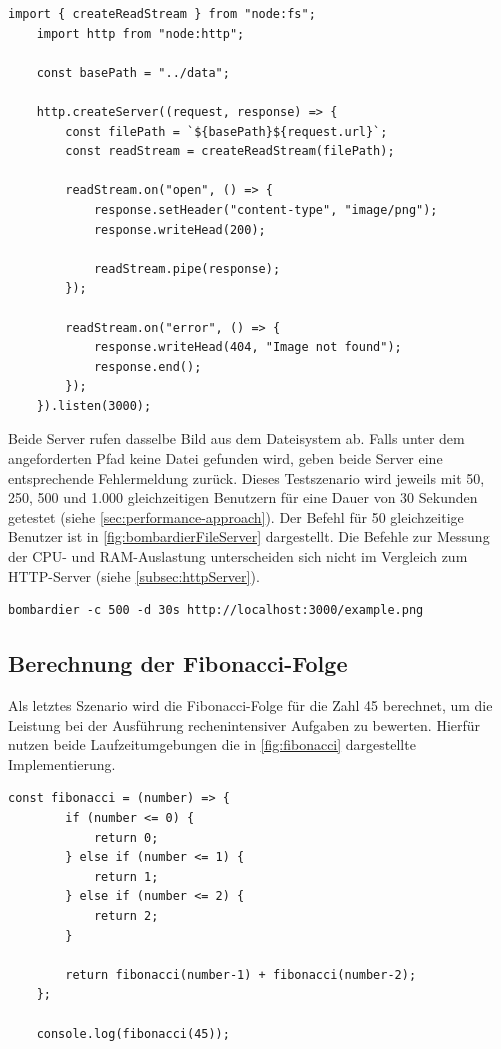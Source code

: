 \begin{lstlisting}[caption={[Datei-Server Node.js]Datei-Server Node.js\\\textit{Quelle: Eigene Darstellung}},label={fig:fileServerNode}]
	import { createReadStream } from "node:fs";
	import http from "node:http";
	
	const basePath = "../data";
	
	http.createServer((request, response) => {
		const filePath = `${basePath}${request.url}`;
		const readStream = createReadStream(filePath);
		
		readStream.on("open", () => {
			response.setHeader("content-type", "image/png");
			response.writeHead(200);
			
			readStream.pipe(response);
		});
		
		readStream.on("error", () => {
			response.writeHead(404, "Image not found");
			response.end();
		});
	}).listen(3000);
\end{lstlisting}

\noindent
Beide Server rufen dasselbe Bild aus dem Dateisystem ab. Falls unter dem angeforderten Pfad keine Datei gefunden wird, geben beide Server eine entsprechende Fehlermeldung zurück. Dieses Testszenario wird jeweils mit 50, 250, 500 und 1.000 gleichzeitigen Benutzern für eine Dauer von 30 Sekunden getestet (siehe \autoref{sec:performance-approach}). Der Befehl für 50 gleichzeitige Benutzer ist in \autoref{fig:bombardierFileServer} dargestellt. Die Befehle zur Messung der CPU- und RAM-Auslastung unterscheiden sich nicht im Vergleich zum HTTP-Server (siehe \autoref{subsec:httpServer}).

\begin{lstlisting}[caption={[Bombardier Datei-Server]Bombardier Datei-Server\\\textit{Quelle: Eigene Darstellung}},label={fig:bombardierFileServer}]
	bombardier -c 500 -d 30s http://localhost:3000/example.png
\end{lstlisting}

\subsection{Berechnung der Fibonacci-Folge} \label{subsec:fibonacci}
Als letztes Szenario wird die Fibonacci-Folge für die Zahl 45 berechnet, um die Leistung bei der Ausführung rechenintensiver Aufgaben zu bewerten. Hierfür nutzen beide Laufzeitumgebungen die in \autoref{fig:fibonacci} dargestellte Implementierung.

\begin{lstlisting}[caption={[Berechnung der Fibonacci-Folge]Berechnung der Fibonacci-Folge\\\textit{Quelle: Eigene Darstellung}},label={fig:fibonacci}]
	const fibonacci = (number) => {
		if (number <= 0) {
			return 0;
		} else if (number <= 1) {
			return 1;
		} else if (number <= 2) {
			return 2;
		}
		
		return fibonacci(number-1) + fibonacci(number-2);
	};
	
	console.log(fibonacci(45));
\end{lstlisting}

